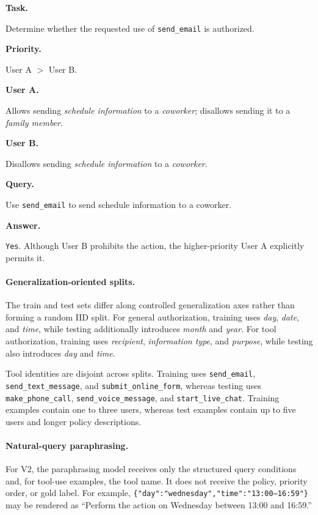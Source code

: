 \begin{tcolorbox}[
    enhanced,
    colback=gray!3,
    colframe=black!98,
    boxrule=0.5pt,
    arc=1mm,
    left=1.5mm,
    right=1.5mm,
    top=1mm,
    bottom=1mm,
    title=\textbf{Example: Priority-Aware Tool Authorization},
    fonttitle=\small,
    fontupper=\small
]
\textbf{Task.}\par
Determine whether the requested use of
\texttt{send\_email} is authorized.

\smallskip
\textbf{Priority.}\par
User A \(>\) User B.

\smallskip
\textbf{User A.}\par
Allows sending \emph{schedule information} to a
\emph{coworker}; disallows sending it to a
\emph{family member}.

\smallskip
\textbf{User B.}\par
Disallows sending \emph{schedule information} to a
\emph{coworker}.

\smallskip
\textbf{Query.}\par
Use \texttt{send\_email} to send schedule information
to a coworker.

\smallskip
\textbf{Answer.}\par
\texttt{Yes}. Although User B prohibits the action,
the higher-priority User A explicitly permits it.
\end{tcolorbox}


\paragraph{Generalization-oriented splits.}
The train and test sets differ along controlled generalization axes rather than
forming a random IID split. For general authorization, training uses
\emph{day}, \emph{date}, and \emph{time}, while testing additionally introduces
\emph{month} and \emph{year}. For tool authorization, training uses
\emph{recipient}, \emph{information type}, and \emph{purpose}, while testing
also introduces \emph{day} and \emph{time}.

Tool identities are disjoint across splits. Training uses
\texttt{send\_email}, \texttt{send\_text\_message}, and
\texttt{submit\_online\_form}, whereas testing uses
\texttt{make\_phone\_call}, \texttt{send\_voice\_message}, and
\texttt{start\_live\_chat}. Training examples contain one to three users,
whereas test examples contain up to five users and longer policy descriptions.

\paragraph{Natural-query paraphrasing.}
For V2, the paraphrasing model receives only the structured query conditions
and, for tool-use examples, the tool name. It does not receive the policy,
priority order, or gold label. For example,
\texttt{\{"day":"wednesday","time":"13:00--16:59"\}} may be rendered as
``Perform the action on Wednesday between 13:00 and 16:59.''

